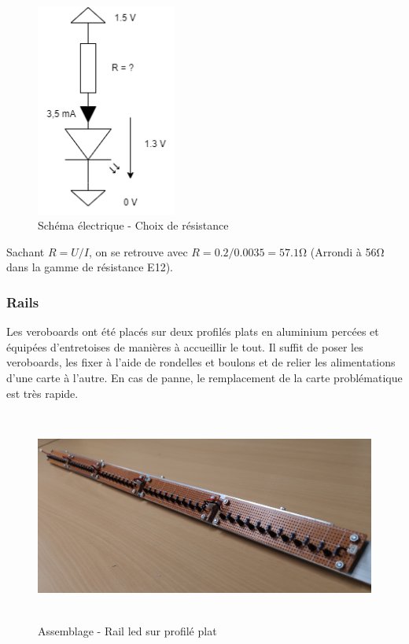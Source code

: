 \begin{figure}[H]
    \centering
    \includegraphics[height=7cm]{assets/figures/schema_led_res.png}
    \caption{Schéma électrique - Choix de résistance}
\end{figure}

Sachant \(R = U / I\), on se retrouve avec \(R = 0.2 / 0.0035 = 57.1 \si{\ohm} \) (Arrondi à 56\si{\ohm} dans la gamme de résistance E12).

\subsubsection{Rails}
Les veroboards ont été placés sur deux profilés plats en aluminium percées et équipées d'entretoises de manières à accueillir le tout. Il suffit de poser les veroboards,
les fixer à l'aide de rondelles et boulons et de relier les alimentations d'une carte à l'autre. En cas de panne, le remplacement de la carte problématique est très rapide.

\begin{figure}[H]
    \centering
    \includegraphics[height=7cm]{assets/figures/rail_alu_led.jpg}
    \caption{Assemblage - Rail led sur profilé plat}
\end{figure}

